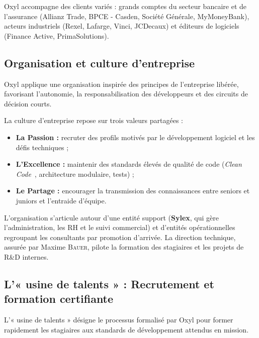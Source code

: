 \documentclass{tnreport}
\begin{document}
Oxyl accompagne des clients variés : grands comptes du secteur bancaire et de l'assurance (Allianz Trade, BPCE - Casden, Société Générale, MyMoneyBank), acteurs industriels (Rexel, Lafarge, Vinci, JCDecaux) et éditeurs de logiciels (Finance Active, PrimaSolutions).

\subsection{Organisation et culture d'entreprise}
\label{subsec:organisation_entreprise_liberee}

Oxyl applique une organisation inspirée des principes de l'entreprise libérée, favorisant l'autonomie, la responsabilisation des développeurs et des circuits de décision courts.

La culture d'entreprise repose sur trois valeurs partagées :
\begin{itemize}
    \item \textbf{La Passion :} recruter des profils motivés par le développement logiciel et les défis techniques ;
    \item \textbf{L'Excellence :} maintenir des standards élevés de qualité de code (\textit{Clean Code}~\cite{martin2008clean}, architecture modulaire, tests) ;
    \item \textbf{Le Partage :} encourager la transmission des connaissances entre seniors et juniors et l'entraide d'équipe.
\end{itemize}

L'organisation s'articule autour d'une entité support (\textbf{Sylex}, qui gère l'administration, les RH et le suivi commercial) et d'entités opérationnelles regroupant les consultants par promotion d'arrivée. La direction technique, assurée par Maxime \textsc{Bauer}, pilote la formation des stagiaires et les projets de R\&D internes.

\subsection{L'« usine de talents » : Recrutement et formation certifiante}
\label{subsec:usine_talents}

L'« usine de talents » désigne le processus formalisé par Oxyl pour former rapidement les stagiaires aux standards de développement attendus en mission.
\end{document}
